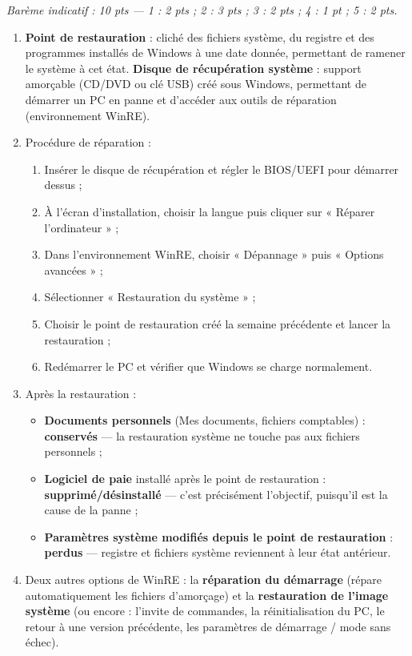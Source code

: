 \documentclass[11pt]{article}
\begin{document}
\begin{corrige}
\emph{Barème indicatif : 10 pts — 1 : 2 pts ; 2 : 3 pts ; 3 : 2 pts ; 4 : 1 pt ; 5 : 2 pts.}
\begin{enumerate}
  \item \textbf{Point de restauration} : cliché des fichiers système, du registre et des programmes installés de Windows à une date donnée, permettant de ramener le système à cet état. \textbf{Disque de récupération système} : support amorçable (CD/DVD ou clé USB) créé sous Windows, permettant de démarrer un PC en panne et d'accéder aux outils de réparation (environnement WinRE).
  \item Procédure de réparation :
  \begin{enumerate}
    \item Insérer le disque de récupération et régler le BIOS/UEFI pour démarrer dessus ;
    \item À l'écran d'installation, choisir la langue puis cliquer sur « Réparer l'ordinateur » ;
    \item Dans l'environnement WinRE, choisir « Dépannage » puis « Options avancées » ;
    \item Sélectionner « Restauration du système » ;
    \item Choisir le point de restauration créé la semaine précédente et lancer la restauration ;
    \item Redémarrer le PC et vérifier que Windows se charge normalement.
  \end{enumerate}
  \item Après la restauration :
  \begin{itemize}
    \item \textbf{Documents personnels} (Mes documents, fichiers comptables) : \textbf{conservés} — la restauration système ne touche pas aux fichiers personnels ;
    \item \textbf{Logiciel de paie} installé après le point de restauration : \textbf{supprimé/désinstallé} — c'est précisément l'objectif, puisqu'il est la cause de la panne ;
    \item \textbf{Paramètres système modifiés depuis le point de restauration} : \textbf{perdus} — registre et fichiers système reviennent à leur état antérieur.
  \end{itemize}
  \item Deux autres options de WinRE : la \textbf{réparation du démarrage} (répare automatiquement les fichiers d'amorçage) et la \textbf{restauration de l'image système} (ou encore : l'invite de commandes, la réinitialisation du PC, le retour à une version précédente, les paramètres de démarrage / mode sans échec).

\end{enumerate}
\end{corrige}
\end{document}
